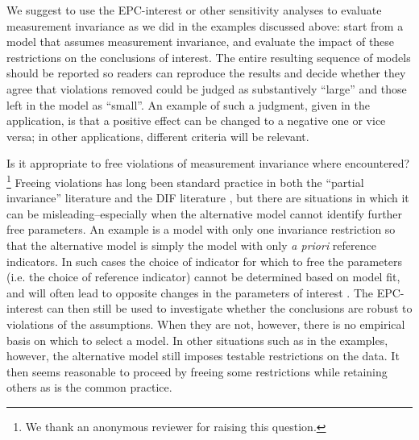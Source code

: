 \documentclass[letterpaper,12pt]{article}
\begin{document}
We suggest to use the EPC-interest or other sensitivity analyses to evaluate measurement invariance as we did in the examples discussed above: start from a model that assumes measurement invariance, and evaluate the impact of these restrictions on the conclusions of interest. The entire resulting sequence of models should be reported so readers can reproduce the results and decide whether they agree that violations removed could be judged as substantively ``large'' and those left in the model as ``small''. An example of such a judgment, given in the application, is that a positive effect can be changed to a negative one or vice versa; in other applications, different criteria will be relevant.

Is it appropriate to free violations of measurement invariance where encountered?\footnote{We thank an anonymous reviewer for raising this question.} Freeing violations has long been standard practice in both the ``partial invariance'' literature \citep{byrne1989testing} and the DIF literature \citep{Holland:1993aa}, but there are situations in which it can be misleading--especially when the alternative model cannot identify further free parameters. An example is a model with only one invariance restriction so that the alternative model is simply the model with only \emph{a priori} reference indicators. In such cases the choice of indicator for which to free the parameters (i.e. the choice of reference indicator) cannot be determined based on model fit, and will often lead to opposite changes in the parameters of interest \citep{hancock2009tenuousness}. The EPC-interest can then still be used to investigate whether the conclusions are robust to violations of the assumptions. When they are not, however, there is no empirical basis on which to select a model. In other situations such as in the examples, however, the alternative model still imposes testable restrictions on the data. It then seems reasonable to proceed by freeing some restrictions while retaining others as is the common practice.



\end{document}
